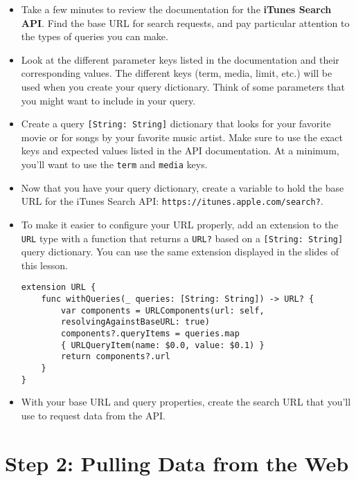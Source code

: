 \documentclass[a4paper,11pt]{scrartcl}
\begin{document}
\begin{itemize}
\item Take a few minutes to review the documentation for the \textbf{iTunes Search API}. Find the base URL for search requests, and pay particular attention to the types of queries you can make. 
\item Look at the different parameter keys listed in the documentation and their corresponding values. The different keys (term, media, limit, etc.) will be used when you create your query dictionary. Think of some parameters that you might want to include in your query. 
\item Create a query \texttt{[String: String]} dictionary that looks for your favorite movie or for songs by your favorite music artist. Make sure to use the exact keys and expected values listed in the API documentation. At a minimum, you'll want to use the \texttt{term} and \texttt{media} keys.
\item Now that you have your query dictionary, create a variable to hold the base URL for the iTunes Search API: \texttt{https://itunes.apple.com/search?}.
\item To make it easier to configure your URL properly, add an extension to the \texttt{URL} type with a function that returns a \texttt{URL?} based on a \texttt{[String: String]} query dictionary. You can use the same extension displayed in the slides of this lesson.
\begin{lstlisting}
extension URL {
    func withQueries(_ queries: [String: String]) -> URL? {
        var components = URLComponents(url: self,
        resolvingAgainstBaseURL: true)
        components?.queryItems = queries.map
        { URLQueryItem(name: $0.0, value: $0.1) }
        return components?.url
    }
}
\end{lstlisting}
\item With your base URL and query properties, create the search URL that you'll use to request data from the API.
\end{itemize}

\section*{Step 2: Pulling Data from the Web}
\end{document}
